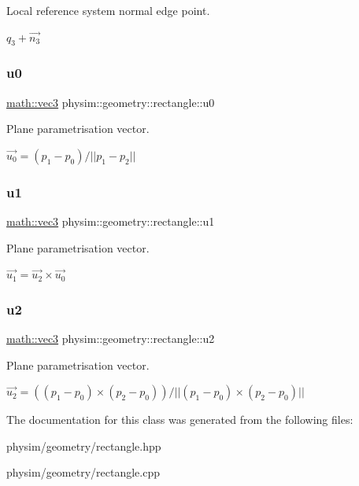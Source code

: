 Local reference system normal edge point. 

$q_3 + \vec{n_3}$ \mbox{\label{classphysim_1_1geometry_1_1rectangle_a96c2dad6c61e11d78b4d3bd8d0f1a0d9}} 
\subsubsection{\texorpdfstring{u0}{u0}}
{\footnotesize\ttfamily \hyperlink{structphysim_1_1math_1_1vec3}{math\+::vec3} physim\+::geometry\+::rectangle\+::u0\hspace{0.3cm}{\ttfamily [private]}}



Plane parametrisation vector. 

$ \vec{u_0} = (p_1 - p_0)/||p_1 - p_2|| $ \mbox{\label{classphysim_1_1geometry_1_1rectangle_ac06c97e8c8d9a1f133d444bfd18b8325}} 
\subsubsection{\texorpdfstring{u1}{u1}}
{\footnotesize\ttfamily \hyperlink{structphysim_1_1math_1_1vec3}{math\+::vec3} physim\+::geometry\+::rectangle\+::u1\hspace{0.3cm}{\ttfamily [private]}}



Plane parametrisation vector. 

$ \vec{u_1} = \vec{u_2} \times \vec{u_0} $ \mbox{\label{classphysim_1_1geometry_1_1rectangle_ac944360ddf607216343ada97e2135bdc}} 
\subsubsection{\texorpdfstring{u2}{u2}}
{\footnotesize\ttfamily \hyperlink{structphysim_1_1math_1_1vec3}{math\+::vec3} physim\+::geometry\+::rectangle\+::u2\hspace{0.3cm}{\ttfamily [private]}}



Plane parametrisation vector. 

$ \vec{u_2} = ( (p_1-p_0)\times(p_2-p_0) )/ || (p_1-p_0)\times(p_2-p_0) || $ 

The documentation for this class was generated from the following files\+:\begin{DoxyCompactItemize}
\item 
physim/geometry/rectangle.\+hpp\item 
physim/geometry/rectangle.\+cpp\end{DoxyCompactItemize}
